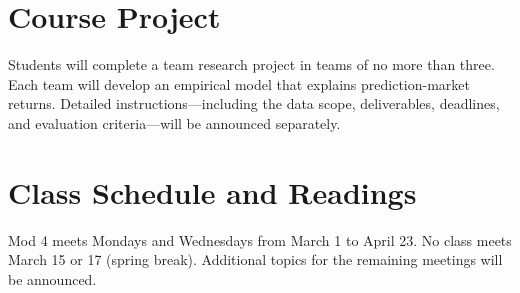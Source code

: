 \documentclass[11pt]{article}
\begin{document}
\section*{Course Project}
Students will complete a team research project in teams of no more than three.
Each team will develop an empirical model that explains prediction-market
returns. Detailed instructions---including the data scope, deliverables,
deadlines, and evaluation criteria---will be announced separately.

\section*{Class Schedule and Readings}
Mod 4 meets Mondays and Wednesdays from March 1 to April 23. No class meets
March 15 or 17 (spring break). Additional topics for the remaining meetings
will be announced.
\end{document}
